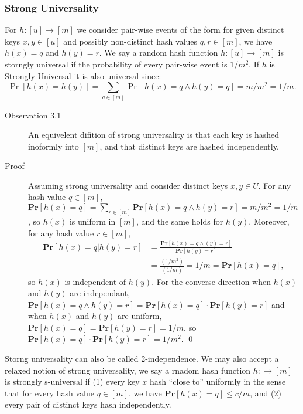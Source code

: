 \subsubsection{Strong Universality}
For $h : [u] \rightarrow [m]$ we consider pair-wise events of the form for given
distinct keys $x,y \in [u]$ and possibly non-distinct hash values $q,r \in [m]$,
we have $h(x) = q$ and $h(y) = r$. We say a random hash function $h : [u]
\rightarrow [m]$ is storngly universal if the probability of every pair-wise
event is $1/m^2$. If $h$ is Strongly Universal it is also universal since:
\[
  \Pr[h(x) = h(y)] = \sum_{q\in [m]} \Pr[h(x) = q \land h(y) = q] = m/m^2  = 1/m.
\]

\begin{description}
\item[Observation 3.1] An equivelent difition of strong universality is that
  each key is hashed inoformly into $[m]$, and that distinct keys are hashed
  independently.
\item[Proof] Assuming strong universality and consider distinct keys $x,y \in
  U$. For any hash value $q \in [m]$, $\textbf{Pr}[h(x)=q] = \sum_{r\in [m]}
  \textbf{Pr}[h(x) = q \land h(y) = r] = m/m^2 = 1/m$, so $h(x)$ is uniform in
  $[m]$, and the same holds for $h(y)$. Moreover, for any hash value $r\in[m]$,
  \begin{align*}
    \textbf{Pr}[h(x)=q|h(y)=r] &= \frac{\textbf{Pr}[h(x)=q\land (y)=r]}{\textbf{Pr}[h(y)=r]} \\
    &= \frac{(1/m^2)}{(1/m)} = 1/m = \textbf{Pr}[h(x)=q],
  \end{align*}
  so $h(x)$ is independent of $h(y)$. For the converse direction when $h(x)$ and
  $h(y)$ are independant,$\textbf{Pr}[h(x)=q \land h(y)=r] = \textbf{Pr}[h(x)=q]
  \cdot \textbf{Pr}[h(y)=r]$ and when $h(x)$ and $h(y)$ are uniform,
  $\textbf{Pr}[h(x)=q] = \textbf{Pr}[h(y)=r]=1/m$, so $\textbf{Pr}[h(x)=q] \cdot
  \textbf{Pr}[h(y)=r] = 1/m^2$. \qed
\end{description}

Storng universality can also be called 2-independence. We may also accept a
relaxed notion of strong universality, we say a rnadom hash function $h:
\rightarrow[m]$ is strongly s-universal if (1) every key $x$ hash ``close to''
uniformly in the sense that for every hash value $q \in [m]$, we have
$\textbf{Pr}[h(x)=q] \leq c/m$, and (2) every pair of distinct keys hash
independently.

